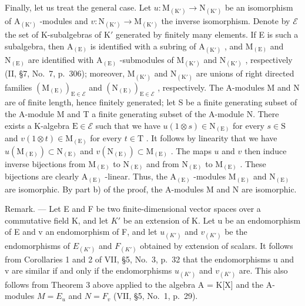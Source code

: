\begin{enumerate}
  Finally, let us treat the general case. Let \(u: \mathrm{M}_{(\mathrm{K}')} \to \mathrm{N}_{(\mathrm{K}')}\) be an isomorphism of \(\mathrm{A}_{(\mathrm{K}')}\) -modules and \(v: \mathrm{N}_{(\mathrm{K}')} \to \mathrm{M}_{(\mathrm{K}')}\) the inverse isomorphism. Denote by \(\mathcal{E}\) the set of K-subalgebras of \(\mathrm{K}'\) generated by finitely many elements. If E is such a subalgebra, then \(\mathrm{A}_{(\mathrm{E})}\) is identified with a subring of \(\mathrm{A}_{(\mathrm{K}')}\) , and \(\mathrm{M}_{(\mathrm{E})}\) and \(\mathrm{N}_{(\mathrm{E})}\) are identified with \(\mathrm{A}_{(\mathrm{E})}\) -submodules of \(\mathrm{M}_{(\mathrm{K}')}\) and \(\mathrm{N}_{(\mathrm{K}')}\) , respectively (II, §7, No.~7, p.~306); moreover, \(\mathrm{M}_{(\mathrm{K}')}\) and \(\mathrm{N}_{(\mathrm{K}')}\) are unions of right directed families \((\mathrm{M}_{(\mathrm{E})})_{\mathrm{E} \in \mathcal{E}}\) and \((\mathrm{N}_{(\mathrm{E})})_{\mathrm{E} \in \mathcal{E}}\) , respectively. The A-modules M and N are of finite length, hence finitely generated; let S be a finite generating subset of the A-module M and T a finite generating subset of the A-module N. There exists a K-algebra \(\mathrm{E} \in \mathcal{E}\) such that we have \(u(1 \otimes s) \in \mathrm{N}_{(\mathrm{E})}\) for every \(s \in \mathrm{S}\) and \(v(1 \otimes t) \in \mathrm{M}_{(\mathrm{E})}\) for every \(t \in \mathrm{T}\) . It follows by linearity that we have \(u(\mathrm{M}_{(\mathrm{E})}) \subset \mathrm{N}_{(\mathrm{E})}\) and \(v(\mathrm{N}_{(\mathrm{E})}) \subset \mathrm{M}_{(\mathrm{E})}\) . The maps \(u\) and \(v\) then induce inverse bijections from \(\mathrm{M}_{(\mathrm{E})}\) to \(\mathrm{N}_{(\mathrm{E})}\) and from \(\mathrm{N}_{(\mathrm{E})}\) to \(\mathrm{M}_{(\mathrm{E})}\) . These bijections are clearly \(\mathrm{A}_{(\mathrm{E})}\) -linear. Thus, the \(\mathrm{A}_{(\mathrm{E})}\) -modules \(\mathrm{M}_{(\mathrm{E})}\) and \(\mathrm{N}_{(\mathrm{E})}\) are isomorphic. By part b) of the proof, the A-modules M and N are isomorphic.
\end{enumerate}

Remark. --- Let E and F be two finite-dimensional vector spaces over a commutative field K, and let \(K'\) be an extension of K. Let u be an endomorphism of E and v an endomorphism of F, and let \(u_{(K')}\) and \(v_{(K')}\) be the endomorphisms of \(E_{(K')}\) and \(F_{(K')}\) obtained by extension of scalars. It follows from Corollaries 1 and 2 of VII, §5, No.~3, p.~32 that the endomorphisms u and v are similar if and only if the endomorphisms \(u_{(K')}\) and \(v_{(K')}\) are. This also follows from Theorem 3 above applied to the algebra A = K{[}X{]} and the A-modules \(M = E_u\) and \(N = F_v\) (VII, §5, No.~1, p.~29).

